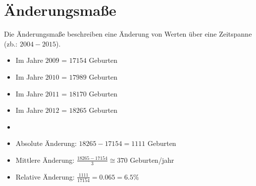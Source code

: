 \newpage
\section{Änderungsmaße}

\hfill \break
Die Änderungsmaße beschreiben eine Änderung von Werten über eine Zeitspanne (zb.: $2004-2015$).

\begin{itemize}
    \item Im Jahre $2009$ = $17154$ Geburten
    \item Im Jahre $2010$ = $17989$ Geburten
    \item Im Jahre $2011$ = $18170$ Geburten
    \item Im Jahre $2012$ = $18265$ Geburten
    \item
    \item Absolute Änderung: $18265-17154 = 1111$ Geburten
    \item Mittlere Änderung: $\frac{18265-17154}{3} \cong 370$ Geburten/jahr
    \item Relative Änderung: $\frac{1111}{17154} = 0.065 = 6.5\%$
\end{itemize}


\hfill \break
\break


